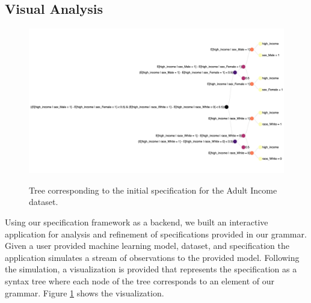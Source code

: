 \begin{subappendices}

\subsection{Visual Analysis}
\label{sec:implementation:vis}
\begin{figure}
    \centering
    \includegraphics[width=\textwidth, angle=90,alt={Internal representation of parsed tree for a specification.}]{avoir/images/adult-spec-tree-initial.png}
    \caption{Tree corresponding to the initial specification for the Adult Income dataset.}
    \label{fig:impl:adult:initial-spec}
\end{figure}

Using our specification framework as a backend, we built an interactive application for analysis and refinement of specifications provided in our grammar.
Given a user provided machine learning model, dataset, and specification the application simulates a stream of observations to the provided model.
Following the simulation, a visualization is provided that represents the specification as a syntax tree where each node of the tree corresponds to an element of our grammar.
Figure \ref{fig:impl:adult:initial-spec} shows the visualization.


\end{subappendices}
